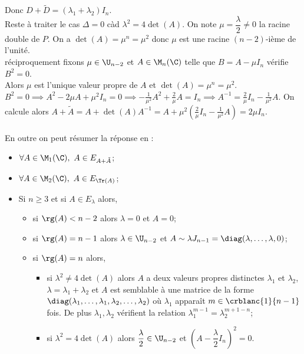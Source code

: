 \documentclass[8pt]{book}
\begin{document}
\begin{enumerate}[leftmargin=*]
		Donc $D+\tilde D=(\lambda_1+\lambda_2)I_n$.\\
		Reste à traiter le cas $\Delta=0$ càd $\lambda^2=4\det(A)$. On note $\mu=\dfrac{\lambda}{2}\ne 0$ la racine double de $P$. On a $\det(A)=\mu^n=\mu^2$ donc $\mu$ est une racine $(n-2)$-ième de l'unité.\\
		réciproquement fixons $\mu\in \U_{n-2}$ et $A\in \M_n(\C)$ telle que $B=A-\mu I_n$ vérifie $B^2=0$.\\
		Alors $\mu$ est l'unique valeur propre de $A$ et $\det(A)=\mu^n=\mu^2$.
		$B^2=0\implies A^2-2\mu A+\mu^2I_n=0\implies \displaystyle-\frac{1}{\mu^2}A^2+\frac{2}{\mu}A=I_n\implies A^{-1}=\frac{2}{\mu}I_n-\frac{1}{\mu^2}A$.
		On calcule alors $A+\tilde A=A+\det(A)A^{-1}=A+\displaystyle\mu^2\left(\frac{2}{\mu}I_n-\frac{1}{\mu^2}A\right)=2\mu I_n$.\\\\
		En outre on peut résumer la réponse en :
		\begin{itemize}
			\item $\forall A\in \M_1(\C),\ A\in E_{A+\tilde A}$;
			\item $\forall A\in \M_2(\C),\ A\in E_{\Tr(A)}$;
			\item Si $n\geq 3$ et si $A\in E_\lambda$ alors,
			\begin{itemize}
				\item si $\rg(A)<n-2$ alors $\lambda=0$ et $A=0$;
				\item si $\rg(A)=n-1$ alors $\lambda\in \U_{n-2}$ et $A\sim\lambda J_{n-1}=\diag(\lambda,\dots,\lambda,0)$;
				\item si $\rg(A)=n$ alors,
				\begin{itemize}
					\item si $\lambda^2\ne 4\det(A)$ alors $A$ a deux valeurs propres distinctes $\lambda_1$ et $\lambda_2$, $\lambda=\lambda_1+\lambda_2$ et $A$ est semblable à une matrice de la forme $\diag(\lambda_1,\dots,\lambda_1,\lambda_2,\dots,\lambda_2)$ où $\lambda_1$ apparaît $m\in \crblanc{1}{n-1}$ fois. De plus $\lambda_1,\lambda_2$ vérifient la relation $\lambda_1^{m-1}=\lambda_2^{m+1-n}$;
					\item si $\lambda^2=4\det(A)$ alors $\dfrac{\lambda}{2}\in \U_{n-2}$ et $\left(A-\dfrac{\lambda}{2}I_n\right)^2=0$.
				\end{itemize}
			\end{itemize}
		\end{itemize}
	\end{enumerate}
	
\end{document}
